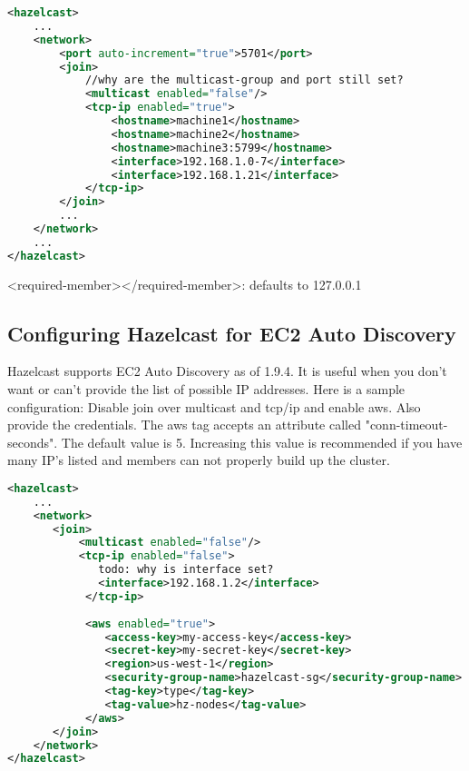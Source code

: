 \begin{lstlisting}[language=xml]
<hazelcast>
    ...
    <network>
        <port auto-increment="true">5701</port>
        <join>
            //why are the multicast-group and port still set?
            <multicast enabled="false"/>
            <tcp-ip enabled="true">
                <hostname>machine1</hostname>
                <hostname>machine2</hostname>
                <hostname>machine3:5799</hostname>
                <interface>192.168.1.0-7</interface>     
                <interface>192.168.1.21</interface> 
            </tcp-ip>
        </join>
        ...
    </network>
    ...
</hazelcast>
\end{lstlisting}

<required-member></required-member>: defaults to 127.0.0.1


\subsection{Configuring Hazelcast for EC2 Auto Discovery}

Hazelcast supports EC2 Auto Discovery as of 1.9.4. It is useful when you don't want or can't provide the list of possible IP addresses. Here is a sample configuration: Disable join over multicast and tcp/ip and enable aws. Also provide the credentials. The aws tag accepts an attribute called "conn-timeout-seconds". The default value is 5. Increasing this value is recommended if you have many IP's listed and members can not properly build up the cluster.

\begin{lstlisting}[language=xml]
<hazelcast>
    ...
    <network>
       <join>
           <multicast enabled="false"/>
           <tcp-ip enabled="false">
              todo: why is interface set?
              <interface>192.168.1.2</interface>
            </tcp-ip>
    
            <aws enabled="true">
               <access-key>my-access-key</access-key>
               <secret-key>my-secret-key</secret-key>
               <region>us-west-1</region>                              <!-- optional, default is us-east-1 -->
               <security-group-name>hazelcast-sg</security-group-name> <!-- optional -->
               <tag-key>type</tag-key>                                  <!-- optional -->
               <tag-value>hz-nodes</tag-value>                          <!-- optional -->
            </aws>
       </join>
    </network>
</hazelcast>
\end{lstlisting}

